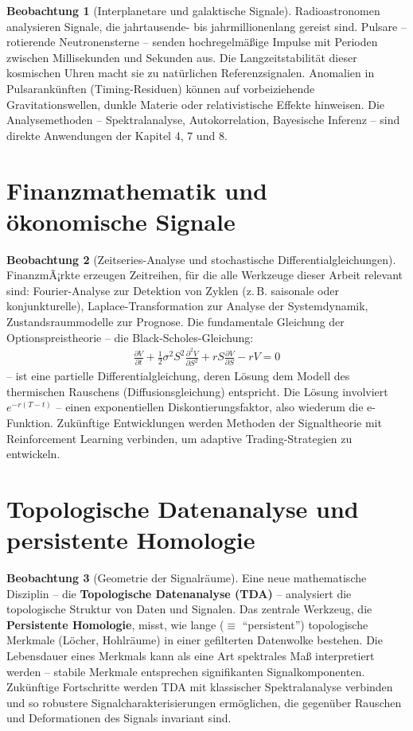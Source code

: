 ﻿\documentclass[a4paper,12pt]{report}
\theoremstyle{definition}
\newtheorem{beobachtung}{Beobachtung}
\begin{document}
	\begin{beobachtung}[Interplanetare und galaktische Signale]
		Radioastronomen analysieren Signale, die jahrtausende- bis jahrmillionenlang gereist sind. Pulsare -- rotierende Neutronensterne -- senden hochregelmäßige Impulse mit Perioden zwischen Millisekunden und Sekunden aus. Die Langzeitstabilität dieser kosmischen Uhren macht sie zu natürlichen Referenzsignalen. Anomalien in Pulsarankünften (Timing-Residuen) können auf vorbeiziehende Gravitationswellen, dunkle Materie oder relativistische Effekte hinweisen. Die Analysemethoden -- Spektralanalyse, Autokorrelation, Bayesische Inferenz -- sind direkte Anwendungen der Kapitel 4, 7 und 8.
	\end{beobachtung}
	
	\section{Finanzmathematik und ökonomische Signale}
	
	\begin{beobachtung}[Zeitseries-Analyse und stochastische Differentialgleichungen]
		FinanzmÃ¡rkte erzeugen Zeitreihen, für die alle Werkzeuge dieser Arbeit relevant sind: Fourier-Analyse zur Detektion von Zyklen (z.\,B. saisonale oder konjunkturelle), Laplace-Transformation zur Analyse der Systemdynamik, Zustandsraummodelle zur Prognose. Die fundamentale Gleichung der Optionspreistheorie -- die Black-Scholes-Gleichung:
		\begin{align}
			\frac{\partial V}{\partial t} + \frac{1}{2}\sigma^2 S^2 \frac{\partial^2 V}{\partial S^2} + rS \frac{\partial V}{\partial S} - rV = 0
		\end{align}
		-- ist eine partielle Differentialgleichung, deren Lösung dem Modell des thermischen Rauschens (Diffusionsgleichung) entspricht. Die Lösung involviert $e^{-r(T-t)}$ -- einen exponentiellen Diskontierungsfaktor, also wiederum die e-Funktion. Zukünftige Entwicklungen werden Methoden der Signaltheorie mit Reinforcement Learning verbinden, um adaptive Trading-Strategien zu entwickeln.
	\end{beobachtung}
	
	\section{Topologische Datenanalyse und persistente Homologie}
	
	\begin{beobachtung}[Geometrie der Signalräume]
		Eine neue mathematische Disziplin -- die \textbf{Topologische Datenanalyse (TDA)} -- analysiert die topologische Struktur von Daten und Signalen. Das zentrale Werkzeug, die \textbf{Persistente Homologie}, misst, wie lange ($\equiv$ ``persistent'') topologische Merkmale (Löcher, Hohlräume) in einer gefilterten Datenwolke bestehen. Die Lebensdauer eines Merkmals kann als eine Art spektrales Maß interpretiert werden -- stabile Merkmale entsprechen signifikanten Signalkomponenten. Zukünftige Fortschritte werden TDA mit klassischer Spektralanalyse verbinden und so robustere Signalcharakterisierungen ermöglichen, die gegenüber Rauschen und Deformationen des Signals invariant sind.
	\end{beobachtung}
	
\end{document}
